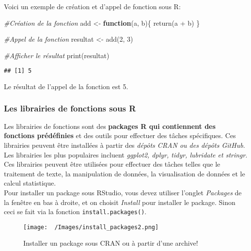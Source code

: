 \documentclass[
]{article}
\newenvironment{Shaded}{\begin{snugshade}}{\end{snugshade}}
\newcommand{\CommentTok}[1]{\textcolor[rgb]{0.56,0.35,0.01}{\textit{#1}}}
\newcommand{\ControlFlowTok}[1]{\textcolor[rgb]{0.13,0.29,0.53}{\textbf{#1}}}
\newcommand{\DecValTok}[1]{\textcolor[rgb]{0.00,0.00,0.81}{#1}}
\newcommand{\FunctionTok}[1]{\textcolor[rgb]{0.00,0.00,0.00}{#1}}
\newcommand{\NormalTok}[1]{#1}
\newcommand{\OtherTok}[1]{\textcolor[rgb]{0.56,0.35,0.01}{#1}}
\newcommand{\SpecialCharTok}[1]{\textcolor[rgb]{0.00,0.00,0.00}{#1}}
\begin{document}
Voici un exemple de création et d'appel de fonction sous R:

\begin{Shaded}
\begin{Highlighting}[]
\CommentTok{\#Création de la fonction }
\NormalTok{add }\OtherTok{\textless{}{-}} \ControlFlowTok{function}\NormalTok{(a, b)\{ }
  \FunctionTok{return}\NormalTok{(a }\SpecialCharTok{+}\NormalTok{ b)}
\NormalTok{\}}

\CommentTok{\#Appel de la fonction }
\NormalTok{resultat }\OtherTok{\textless{}{-}} \FunctionTok{add}\NormalTok{(}\DecValTok{2}\NormalTok{, }\DecValTok{3}\NormalTok{)}

\CommentTok{\#Afficher le résultat }
\FunctionTok{print}\NormalTok{(resultat)}
\end{Highlighting}
\end{Shaded}

\begin{verbatim}
## [1] 5
\end{verbatim}

Le résultat de l'appel de la fonction est 5.

\hypertarget{les-librairies-de-fonctions-sous-r}{%
\subsubsection{Les librairies de fonctions sous R}\label{les-librairies-de-fonctions-sous-r}}

Les librairies de fonctions sont des \textbf{packages R qui contiennent des fonctions prédéfinies} et des outils pour effectuer des tâches spécifiques. Ces librairies peuvent être installées à partir des \emph{dépôts CRAN ou des dépôts GitHub}. Les librairies les plus populaires incluent \emph{ggplot2, dplyr, tidyr, lubridate et stringr}. Ces librairies peuvent être utilisées pour effectuer des tâches telles que le traitement de texte, la manipulation de données, la visualisation de données et le calcul statistique.\\
Pour installer un package sous RStudio, vous devez utiliser l'onglet \emph{Packages} de la fenêtre en bas à droite, et on choisit \emph{Install} pour installer le package. Sinon ceci se fait via la fonction \texttt{install.packages()}.

\begin{figure}
\centering
\texttt{[image: ~/Images/install\_packages2.png]}
\caption{Installer un package sous CRAN ou à partir d'une archive!}
\end{figure}
\end{document}

